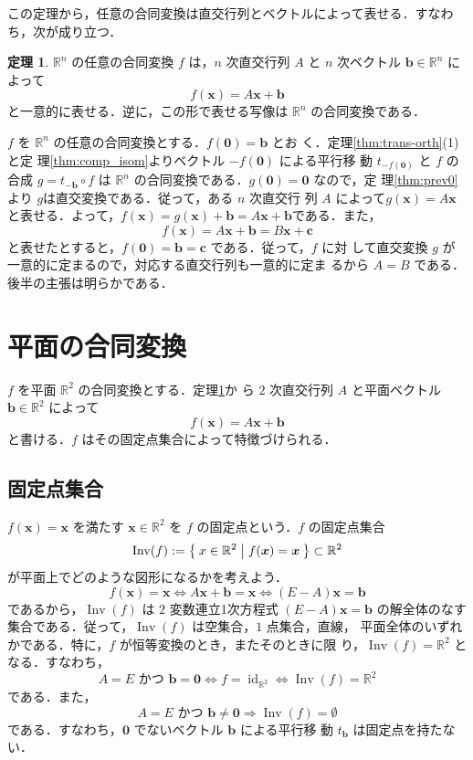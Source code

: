 \documentclass[11pt, uplatex, dvipdfmx, titlepage]{jsarticle}
\makeatletter
\DeclareMathOperator{\Inv}{Inv}
\DeclareMathOperator{\id}{id}
\renewenvironment{proof}[1][\proofname]{\par
  \pushQED{\qed}%
  \normalfont \topsep6\p@\@plus6\p@\relax
  \trivlist
  \item[\hskip\labelsep
         \bfseries
    {#1}]\ignorespaces
}{%
  \popQED\endtrivlist\@endpefalse
}
\theoremstyle{definition}
\newtheorem{theorem}{定理}[section]
\renewcommand{\proofname}{\textbf{証明}}
\makeatother
\begin{document}
この定理から，任意の合同変換は直交行列とベクトルによって表せる．すなわち，次が成り立つ．

\begin{theorem}\label{thm:affine_rep}
  $\mathbb{R}^n$ の任意の合同変換 $f$ は，$n$ 次直交行列 $A$
  と $n$ 次ベクトル $\bm{b} \in \mathbb{R}^n$ によって
  \[
    f(\bm{x}) = A\bm{x} + \bm{b}
  \]
  と一意的に表せる．逆に，この形で表せる写像は $\mathbb{R}^n$ の合同変換である．
\end{theorem}


\begin{proof}
  $f$ を $\mathbb{R}^n$ の任意の合同変換とする．$f(\bm{0})=\bm{b}$ とお
  く．定理\ref{thm:trans-orth}(1)と定
  理\ref{thm:comp_isom}よりベクトル $-f(\bm{0})$ による平行移
  動 $t_{-f(\bm{0})}$ と $f$ の合成 $g = t_{-\bm{b}} \circ
  f$ は $\mathbb{R}^n$ の合同変換である．$g(\bm{0})=\bm{0}$ なので，定
  理\ref{thm:prev0}より $g$は直交変換である．従って，ある $n$ 次直交行
  列 $A$
  によって$g(\bm{x})=A\bm{x}$と表せる．よって，$f(\bm{x}) =
  g(\bm{x})+\bm{b} = A\bm{x} + \bm{b}$である．また，
  \[
    f(\bm{x}) = A\bm{x}+\bm{b} = B\bm{x} + \bm{c}
  \]
  と表せたとすると，$f(\bm{0})=\bm{b}=\bm{c}$ である．従って，$f$ に対
  して直交変換 $g$ が一意的に定まるので，対応する直交行列も一意的に定ま
  るから $A=B$ である．後半の主張は明らかである．
\end{proof}


\section{平面の合同変換}\label{sec:2dim}


$f$ を平面 $\mathbb{R}^2$ の合同変換とする．定理\ref{thm:affine_rep}か
ら $2$ 次直交行列 $A$ と平面ベクトル $\bm{b} \in \mathbb{R}^2$ によって
\[
  f(\bm{x}) = A\bm{x} + \bm{b}
\]
と書ける．$f$ はその固定点集合によって特徴づけられる．

\subsection{固定点集合}\label{sec:inv2}

$f(\bm{x})=\bm{x}$ を満たす $\bm{x} \in \mathbb{R}^2$ を $f$ の固定点という．$f$ の固定点集合
\[
  \Inv(f) := \Set{ x \in \mathbb{R}^2 | f(\bm{x}) = \bm{x}} \subset \mathbb{R}^2
\]
が平面上でどのような図形になるかを考えよう．
\[
  f(\bm{x}) = \bm{x} \Leftrightarrow A\bm{x} + \bm{b} = \bm{x} \Leftrightarrow (E-A)\bm{x} = \bm{b}
\]
であるから，$\Inv(f)$ は $2$ 変数連立1次方程式 $(E-A)\bm{x} = \bm{b}$
の解全体のなす集合である．従って，$\Inv(f)$ は空集合，$1$ 点集合，直線，
平面全体のいずれかである．特に，$f$ が恒等変換のとき，またそのときに限
り，$\Inv(f)=\mathbb{R}^2$ となる．すなわち，
\[
  A=E \text{ かつ } \bm{b} = \bm{0} \Leftrightarrow f =
  \id_{\mathbb{R}^2} \Leftrightarrow \Inv(f) = \mathbb{R}^2
\]
である．また，
\[
  A=E \text{ かつ } \bm{b} \neq \bm{0} \Rightarrow \Inv(f) = \emptyset
\]
である．すなわち，$\bm{0}$ でないベクトル $\bm{b}$ による平行移
動 $t_{\bm{b}}$ は固定点を持たない．
\end{document}
